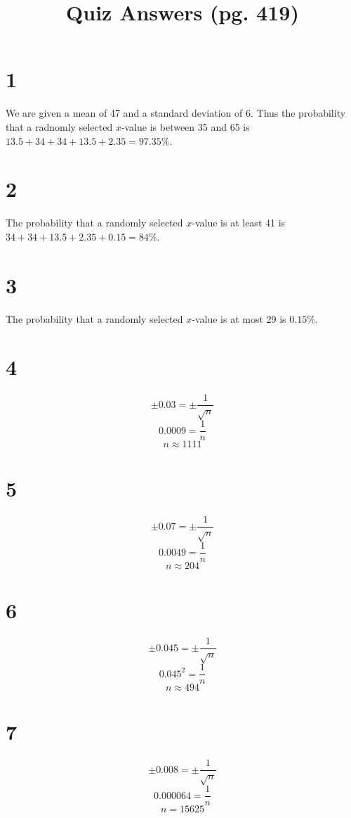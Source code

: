 \documentclass{article}
\title{Quiz Answers (pg. 419)}
\theoremstyle{definition}
\newcommand{\?}{\stackrel{?}{=}}
\begin{document}
\maketitle

\section*{1}
We are given a mean of 47 and a standard deviation of 6. Thus the probability that a radnomly selected $x$-value is between 35 and 65 is 
$13.5+34+34+13.5+2.35=97.35\%$.

\section*{2}
The probability that a randomly selected $x$-value is at least 41 is $34+34+13.5+2.35+0.15=84\%$.

\section*{3}
The probability that a randomly selected $x$-value is at most 29 is $0.15\%$.

\section*{4}
\[ \pm 0.03=\pm\frac{1}{\sqrt{n}} \] \[ 0.0009=\frac{1}{n} \] \[ n\approx 1111 \]

\section*{5}
\[ \pm 0.07=\pm\frac{1}{\sqrt{n}} \] \[ 0.0049=\frac{1}{n} \] \[ n\approx 204 \]

\section*{6}
\[ \pm 0.045=\pm\frac{1}{\sqrt{n}} \] \[ 0.045^2=\frac{1}{n} \] \[ n\approx 494 \]

\section*{7}
\[ \pm 0.008=\pm\frac{1}{\sqrt{n}} \] \[ 0.000064=\frac{1}{n} \] \[ n=15625 \]
\end{document}
